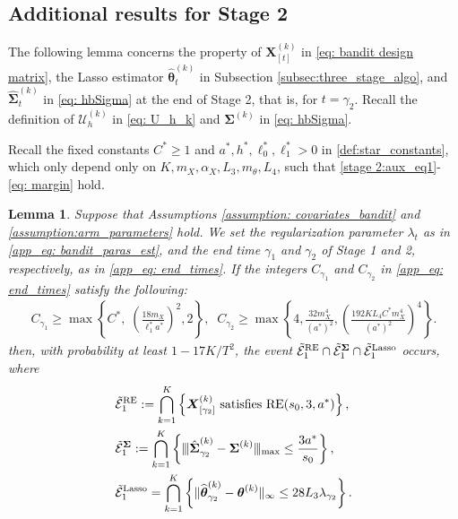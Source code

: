 \documentclass[aos,preprint]{imsart}
\theoremstyle{plain}
\newtheorem{lemma}[theorem]{Lemma}
\theoremstyle{definition}
\newcommand{\btheta}{\boldsymbol{\theta}}
\newcommand{\hbtheta}{\widehat{\boldsymbol{\theta}}}
\newcommand{\bX}{\boldsymbol{X}}
\newcommand{\bSigma}{\boldsymbol{\Sigma}}
\newcommand{\mn}{\vert\kern-0.25ex \vert\kern-0.25ex \vert}
\newcommand{\mE}{\mathcal{E}}
\newcommand{\hbSigma}{\hat{\boldsymbol{\Sigma}}}
\begin{document}
\begin{appendix}
\subsection{Additional results for Stage 2}
The following lemma concerns the property of 
$\bX_{[t]}^{(k)}$ in \eqref{eq: bandit design matrix}, the Lasso estimator $\hbtheta_{t}^{(k)}$ in Subsection \ref{subsec:three_stage_algo}, and $\hbSigma^{(k)}_{t}$ in \eqref{eq: hbSigma} at the end of Stage 2, that is, for $t = \gamma_2$. Recall the definition of $\mathcal{U}_{h}^{(k)}$ in \eqref{eq: U_h_k} and $\bSigma^{(k)}$ in \eqref{eq: hbSigma}.

Recall the fixed constants  $C^* \geq 1$ and $a^*, h^*, \ell_0^*, \ell_1^* > 0$  in \eqref{def:star_constants}, which only depend only on $K,  m_X, \alpha_X,  L_3, m_{\theta}, L_4$, such that \eqref{stage 2:aux_eq1}-\eqref{eq: margin} hold.
\begin{lemma}  \label{stage3: base case}
Suppose that Assumptions \ref{assumption: covariates_bandit} and \ref{assumption:arm_parameters} hold. We set the regularization parameter $\lambda_t$ as in \eqref{app_eq: bandit_paras_est}, and the end time $\gamma_1$ and $\gamma_2$ of Stage 1 and 2, respectively, as in \eqref{app_eq: end_times}.
If the integers $C_{\gamma_1}$ and $C_{\gamma_2}$ in \eqref{app_eq: end_times} satisfy the following:
\begin{align}
    \label{eq: aux_lambda_gamma_12}
     C_{\gamma_1} \ge \max\left\{C^*,\; \left(\frac{18m_X}{\ell_1^* a^*}\right)^2,2\right\}, \;\;
     C_{\gamma_2} \ge \max\left\{4, \frac{32 m_{X}^4}{(a^*)^2}, \left(\frac{192K L_4 C^* m_X^4}{(a^*)^2} \right)^4 \right\}.
\end{align}
then, with probability at least $1-17K/T^2$, the event $\tilde{\mE}_1^{\textup{RE}} \cap \tilde{\mE}_1^{\bSigma} \cap  \tilde{\mE}_1^{\textup{Lasso}}$ occurs, where
\begin{align*}
\begin{split}
&\tilde{\mE}_1^{\textup{RE}} := \bigcap_{k=1}^{K}\left\{\bX_{[\gamma_2]}^{(k)} \textup{ satisfies } \textup{RE}(s_0, 3, a^*)\right\},\\ 
&\tilde{\mE}_1^{\bSigma} := \bigcap_{k=1}^{K}\left\{\mn\hbSigma_{\gamma_2}^{(k)}-\bSigma^{(k)}\mn_{\textup{max}} \le  \frac{3 a^*}{s_0} \right\},\\ 
&\tilde{\mE}_1^{\textup{Lasso}} = \bigcap_{k = 1}^{K}\left\{\|\hbtheta_{\gamma_2}^{(k)} - \btheta^{(k)}\|_{\infty} \leq  28L_3 \lambda_{\gamma_2}\right\}.
\end{split}
\end{align*}
\end{lemma}


\end{appendix}
\end{document}
